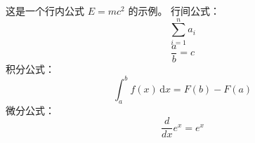 这是一个行内公式 $E=mc^2$ 的示例。
行间公式：
$$\sum_{i=1}^n a_i$$
$$\frac{a}{b} = c$$
积分公式：
$$\int_{a}^{b} {f(x)} \, \mathrm{d}x = F(b) - F(a)$$
微分公式：
$$\frac{d}{dx} e^x = e^x$$